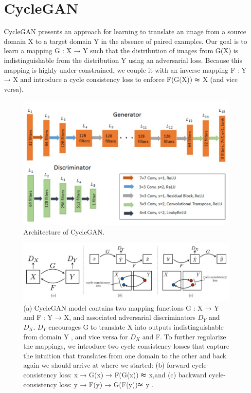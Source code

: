 \section{CycleGAN}
CycleGAN presents an approach for learning to translate an image from a source domain X to a target domain Y in the absence of paired examples. Our goal is to learn a mapping G : X → Y such that the distribution of images from G(X) is indistinguishable from the distribution Y using an adversarial loss. Because this mapping is highly under-constrained, we couple it with an inverse mapping F : Y → X and introduce a cycle consistency loss to enforce F(G(X)) $\thickapprox$ X (and vice versa).


\begin{figure}[h]
    \centering
    \includegraphics[totalheight=2.5in]{Chapter5/ModelCycle.jpg}
    \caption[Architecture of CycleGAN]{Architecture of CycleGAN.\cite{CycleGAN}}
    \label{fig:label5.8}
\end{figure}

\begin{figure}[h]
    \centering
    \includegraphics[totalheight=1.5in]{Chapter5/Model.jpg}
    \caption[CycleGAN]{(a) CycleGAN model contains two mapping functions G : X → Y and F : Y → X, and associated adversarial discriminators ${D_Y}$ and ${D_X}$. ${D_Y}$ encourages G to translate X into outputs indistinguishable from domain Y , and vice versa for ${D_X}$ and F. To further regularize the mappings, we introduce two cycle consistency losses that capture the intuition that translates from one domain to the other and back again we should arrive at where we started: (b) forward cycle-consistency loss: {x → G(x) → F(G(x)) $\thickapprox$ x},and (c) backward cycle-consistency loss: y → F(y) → G(F(y))$ \thickapprox $ y .\cite{CycleGAN}}
    \label{fig:label5.5}
\end{figure}

